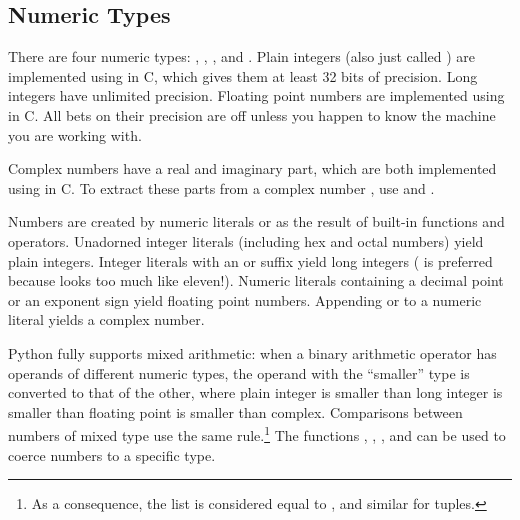 \subsection{Numeric Types \label{typesnumeric}}

There are four numeric types: , , 
, and .
Plain integers (also just called )
are implemented using  in C, which gives them at least 32
bits of precision.  Long integers have unlimited precision.  Floating
point numbers are implemented using  in C.  All bets on
their precision are off unless you happen to know the machine you are
working with.

Complex numbers have a real and imaginary part, which are both
implemented using  in C.  To extract these parts from
a complex number , use  and .  

Numbers are created by numeric literals or as the result of built-in
functions and operators.  Unadorned integer literals (including hex
and octal numbers) yield plain integers.  Integer literals with an
 or  suffix yield long integers
( is preferred because  looks too much like
eleven!).  Numeric literals containing a decimal point or an exponent
sign yield floating point numbers.  Appending  or
 to a numeric literal yields a complex number.

Python fully supports mixed arithmetic: when a binary arithmetic
operator has operands of different numeric types, the operand with the
``smaller'' type is converted to that of the other, where plain
integer is smaller than long integer is smaller than floating point is
smaller than complex.
Comparisons between numbers of mixed type use the same rule.\footnote{
	As a consequence, the list \code{[1, 2]} is considered equal
        to \code{[1.0, 2.0]}, and similar for tuples.
} The functions , , ,
and  can be used
to coerce numbers to a specific type.

